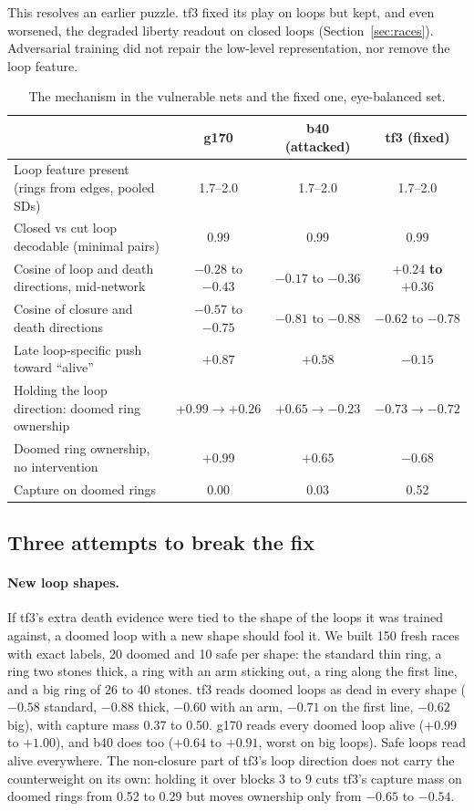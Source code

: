 \documentclass[11pt]{article}
\newcommand{\pos}[1]{$+#1$}
\newcommand{\nega}[1]{$-#1$}
\begin{document}
This resolves an earlier puzzle. tf3 fixed its play on loops but kept, and even worsened, the degraded liberty readout on closed loops (Section~\ref{sec:races}). Adversarial training did not repair the low-level representation, nor remove the loop feature.

\begin{table}[h]
\centering\small
\begin{tabular}{@{}lccc@{}}
\toprule
 & g170 & b40 (attacked) & tf3 (fixed) \\
\midrule
Loop feature present (rings from edges, pooled SDs) & 1.7--2.0 & 1.7--2.0 & 1.7--2.0 \\
Closed vs cut loop decodable (minimal pairs) & 0.99 & 0.99 & 0.99 \\
Cosine of loop and death directions, mid-network & $-0.28$ to $-0.43$ & $-0.17$ to $-0.36$ & $\mathbf{+0.24}$ \textbf{to} $\mathbf{+0.36}$ \\
Cosine of closure and death directions & $-0.57$ to $-0.75$ & $-0.81$ to $-0.88$ & $-0.62$ to $-0.78$ \\
Late loop-specific push toward ``alive'' & $+0.87$ & $+0.58$ & $\mathbf{-0.15}$ \\
Holding the loop direction: doomed ring ownership & $+0.99 \to +0.26$ & $+0.65 \to -0.23$ & $\mathbf{-0.73 \to -0.72}$ \\
Doomed ring ownership, no intervention & $+0.99$ & $+0.65$ & $-0.68$ \\
Capture on doomed rings & 0.00 & 0.03 & 0.52 \\
\bottomrule
\end{tabular}
\caption{The mechanism in the vulnerable nets and the fixed one, eye-balanced set.}
\label{tab:compare}
\end{table}

\subsection{Three attempts to break the fix}

\paragraph{New loop shapes.} If tf3's extra death evidence were tied to the shape of the loops it was trained against, a doomed loop with a new shape should fool it. We built 150 fresh races with exact labels, 20 doomed and 10 safe per shape: the standard thin ring, a ring two stones thick, a ring with an arm sticking out, a ring along the first line, and a big ring of 26 to 40 stones. tf3 reads doomed loops as dead in every shape (\nega{0.58} standard, \nega{0.88} thick, \nega{0.60} with an arm, \nega{0.71} on the first line, \nega{0.62} big), with capture mass 0.37 to 0.50. g170 reads every doomed loop alive (\pos{0.99} to \pos{1.00}), and b40 does too (\pos{0.64} to \pos{0.91}, worst on big loops). Safe loops read alive everywhere. The non-closure part of tf3's loop direction does not carry the counterweight on its own: holding it over blocks 3 to 9 cuts tf3's capture mass on doomed rings from 0.52 to 0.29 but moves ownership only from \nega{0.65} to \nega{0.54}.
\end{document}
